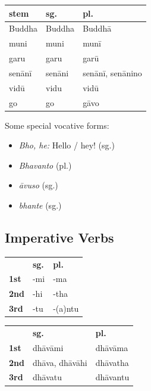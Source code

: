 \documentclass[11pt,oneside]{memoir}
\begin{document}
\bigskip
{\centering\par
\begin{multicols}{2}

\begin{center}
\begin{tabular}{lll}
stem & sg. & pl.\\[0pt]
\hline
Buddha & Buddha & Buddhā\\[0pt]
muni & muni & munī\\[0pt]
garu & garu & garū\\[0pt]
senānī & senāni & senānī, senānino\\[0pt]
vidū & vidu & vidū\\[0pt]
go & go & gāvo\\[0pt]
\end{tabular}
\end{center}

\columnbreak

Some special vocative forms:

\begin{itemize}
\item \emph{Bho, he:} Hello / hey! (sg.)
\item \emph{Bhavanto} (pl.)
\item \emph{āvuso} (sg.)
\item \emph{bhante} (sg.)
\end{itemize}

\end{multicols}
\par}

\subsection{Imperative Verbs}
\label{sec:org3187848}

{\centering\par
\begin{multicols}{2}

\begin{center}
\begin{tabular}{lll}
 & \textbf{sg.} & \textbf{pl.}\\[0pt]
\textbf{1st} & -mi & -ma\\[0pt]
\textbf{2nd} & -hi & -tha\\[0pt]
\textbf{3rd} & -tu & -(a)ntu\\[0pt]
\end{tabular}
\end{center}

\columnbreak

\begin{center}
\begin{tabular}{lll}
 & \textbf{sg.} & \textbf{pl.}\\[0pt]
\textbf{1st} & dhāvāmi & dhāvāma\\[0pt]
\textbf{2nd} & dhāva, dhāvāhi & dhāvatha\\[0pt]
\textbf{3rd} & dhāvatu & dhāvantu\\[0pt]
\end{tabular}
\end{center}

\end{multicols}
\par}
\end{document}

